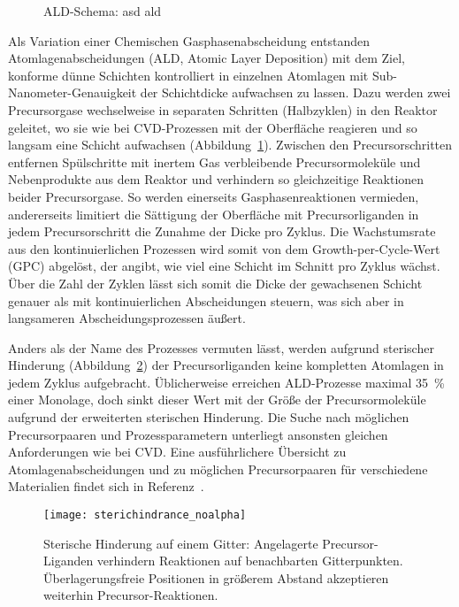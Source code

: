 \begin{figure}
  \centering
  \def\svgwidth{\textwidth}
  
  \caption[ALD-Schema]{ALD-Schema: asd ald}
  \label{fig:ald-schema}
\end{figure}

Als Variation einer Chemischen Gasphasenabscheidung entstanden Atomlagenabscheidungen (ALD, Atomic Layer Deposition) mit dem Ziel, konforme dünne Schichten kontrolliert in einzelnen Atomlagen mit Sub-Nanometer-Genauigkeit der Schichtdicke aufwachsen zu lassen.
Dazu werden zwei Precursorgase wechselweise in separaten Schritten (Halbzyklen) in den Reaktor geleitet, wo sie wie bei CVD-Prozessen mit der Oberfläche reagieren und so langsam eine Schicht aufwachsen (Abbildung~\ref{fig:ald-schema}).
Zwischen den Precursorschritten entfernen Spülschritte mit inertem Gas verbleibende Precursormoleküle und Nebenprodukte aus dem Reaktor und verhindern so gleichzeitige Reaktionen beider Precursorgase.
So werden einerseits Gasphasenreaktionen vermieden, andererseits limitiert die Sättigung der Oberfläche mit Precursorliganden in jedem Precursorschritt die Zunahme der Dicke pro Zyklus.
Die Wachstumsrate aus den kontinuierlichen Prozessen wird somit von dem Growth-per-Cycle-Wert (GPC) abgelöst, der angibt, wie viel eine Schicht im Schnitt pro Zyklus wächst.
Über die Zahl der Zyklen lässt sich somit die Dicke der gewachsenen Schicht genauer als mit kontinuierlichen Abscheidungen steuern, was sich aber in langsameren Abscheidungsprozessen äußert.

Anders als der Name des Prozesses vermuten lässt, werden aufgrund sterischer Hinderung (Abbildung~\ref{fig:sterichindrance}) der Precursorliganden keine kompletten Atomlagen in jedem Zyklus aufgebracht.
Üblicherweise erreichen ALD-Prozesse maximal \SI{35}{\percent} einer Monolage\cite{ylilammi_monolayer_1996}, doch sinkt dieser Wert mit der Größe der Precursormoleküle aufgrund der erweiterten sterischen Hinderung.
Die Suche nach möglichen Precursorpaaren und Prozessparametern unterliegt ansonsten gleichen Anforderungen wie bei CVD.
Eine ausführlichere Übersicht zu Atomlagenabscheidungen und zu möglichen Precursorpaaren für verschiedene Materialien findet sich in Referenz~\cite{puurunen_surface_2005}.

\begin{figure}
  \centering
  \texttt{[image: sterichindrance\_noalpha]}
  \caption[Sterische Hinderung]{Sterische Hinderung auf einem Gitter:
    Angelagerte Precursor-Liganden verhindern Reaktionen auf benachbarten Gitterpunkten.
    Überlagerungsfreie Positionen in größerem Abstand akzeptieren weiterhin Precursor-Reaktionen.
  }
  \label{fig:sterichindrance}
\end{figure}

